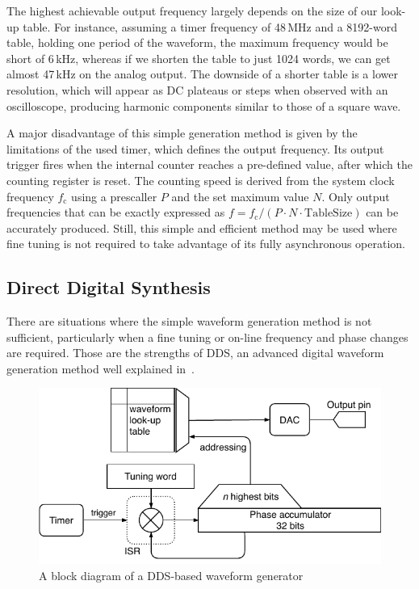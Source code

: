 The highest achievable output frequency largely depends on the size of our look-up table. For instance, assuming a timer frequency of 48\,MHz and a 8192-word table, holding one period of the waveform, the maximum frequency would be short of 6\,kHz, whereas if we shorten the table to just 1024 words, we can get almost 47\,kHz on the analog output. The downside of a shorter table is a lower resolution, which will appear as \gls{DC} plateaus or steps when observed with an oscilloscope, producing harmonic components similar to those of a square wave.

A major disadvantage of this simple generation method is given by the limitations of the used timer, which defines the output frequency. Its output trigger fires when the internal counter reaches a pre-defined value, after which the counting register is reset. The counting speed is derived from the system clock frequency $f_\mathrm{c}$ using a prescaller $P$ and the set maximum value $N$. Only output frequencies that can be exactly expressed as $f=f_\mathrm{c}/(P\cdot N \cdot \mathrm{TableSize})$ can be accurately produced. Still, this simple and efficient method may be used where fine tuning is not required to take advantage of its fully asynchronous operation.

\subsection{Direct Digital Synthesis} \label{sec:theory-dac-dds}

There are situations where the simple waveform generation method is not sufficient, particularly when a fine tuning or on-line frequency and phase changes are required. Those are the strengths of \gls{DDS}, an advanced digital waveform generation method well explained in~\cite{all-about-dds}.

\begin{figure}[h]
	\centering
	\includegraphics[scale=1] {img/wavegen-dds.pdf}
	\caption{\label{fig:wavegen-dds}A block diagram of a DDS-based waveform generator}
\end{figure}

